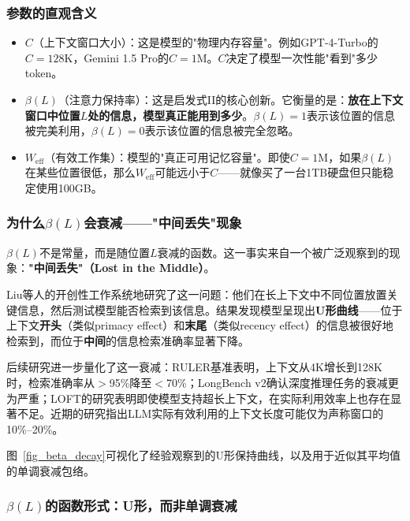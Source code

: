 \subsubsection{参数的直观含义}

\begin{itemize}[nosep]
\item $C$（上下文窗口大小）：这是模型的"物理内存容量"。例如GPT-4-Turbo的$C = 128\mathrm{K}$，Gemini 1.5 Pro的$C = 1\mathrm{M}$。$C$决定了模型一次性能"看到"多少token。
\item $\beta(L)$（注意力保持率）：这是启发式II的核心创新。它衡量的是：\textbf{放在上下文窗口中位置$L$处的信息，模型真正能用到多少}。$\beta(L) = 1$表示该位置的信息被完美利用，$\beta(L) = 0$表示该位置的信息被完全忽略。
\item $W_{\mathrm{eff}}$（有效工作集）：模型的"真正可用记忆容量"。即使$C = 1\mathrm{M}$，如果$\beta(L)$在某些位置很低，那么$W_{\mathrm{eff}}$可能远小于$C$——就像买了一台1TB硬盘但只能稳定使用100GB。
\end{itemize}

\subsubsection{为什么$\beta(L)$会衰减——"中间丢失"现象}

$\beta(L)$不是常量，而是随位置$L$衰减的函数。这一事实来自一个被广泛观察到的现象：\textbf{"中间丢失"（Lost in the Middle）}。

Liu等人的开创性工作系统地研究了这一问题\cite{liu2023lostmiddle}：他们在长上下文中不同位置放置关键信息，然后测试模型能否检索到该信息。结果发现模型呈现出\textbf{U形曲线}——位于上下文\textbf{开头}（类似primacy effect）和\textbf{末尾}（类似recency effect）的信息被很好地检索到，而位于\textbf{中间}的信息检索准确率显著下降。

后续研究进一步量化了这一衰减：RULER基准表明，上下文从4K增长到128K时，检索准确率从$>$95\%降至$<$70\%\cite{ruler2024}；LongBench v2确认深度推理任务的衰减更为严重\cite{longbenchv2_2024}；LOFT的研究表明即使模型支持超长上下文，在实际利用效率上也存在显著不足\cite{loft2024}。近期的研究指出LLM实际有效利用的上下文长度可能仅为声称窗口的10\%--20\%。

图~\ref{fig_beta_decay}可视化了经验观察到的U形保持曲线，以及用于近似其平均值的单调衰减包络。


\subsubsection{$\beta(L)$的函数形式：U形，而非单调衰减}

